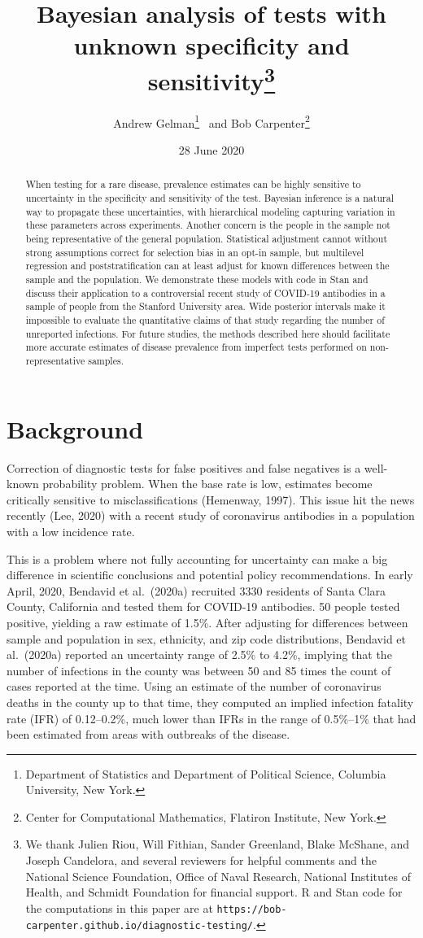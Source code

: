 \documentclass[11pt]{article}
\title{\bf Bayesian analysis of tests with unknown specificity and sensitivity\footnote{We thank Julien Riou, Will Fithian, Sander Greenland, Blake McShane, and Joseph Candelora, and several reviewers for helpful comments and the National Science Foundation, Office of Naval Research, National Institutes of Health, and Schmidt Foundation for financial support.  R and Stan code for the computations in this paper are at {\tt https://bob-carpenter.github.io/diagnostic-testing/}.}\vspace{.1in}}
\author{Andrew Gelman\footnote{Department of Statistics and Department of
Political Science, Columbia University, New York.}  \ and Bob Carpenter\footnote{Center for Computational Mathematics, Flatiron Institute, New York.}
\vspace{.1in}}
\date{28 June 2020}
\begin{document}
\sloppy
\maketitle

\begin{abstract}
\noindent
When testing for a rare disease, prevalence estimates can be highly sensitive to uncertainty in the specificity and sensitivity of the test.  Bayesian inference is a natural way to propagate these uncertainties, with hierarchical modeling capturing variation in these parameters across experiments.  Another concern is the people in the sample not being representative of the general population.  Statistical adjustment cannot without strong assumptions correct for selection bias in an opt-in sample, but multilevel regression and poststratification can at least adjust for known differences between the sample and the population.  We demonstrate these models with code in Stan and discuss their application to a controversial recent study of COVID-19 antibodies in a sample of people from the Stanford University area.  Wide posterior intervals make it impossible to evaluate the quantitative claims of that study regarding the number of unreported infections.  For future studies, the methods described here should facilitate more accurate estimates of disease prevalence from imperfect tests performed on non-representative samples.
\end{abstract}

\section{Background}

Correction of diagnostic tests for false positives and false negatives is a well-known probability problem.  When the base rate is low, estimates become critically sensitive to misclassifications (Hemenway, 1997).  This issue hit the news recently (Lee, 2020) with a recent study of coronavirus antibodies in a population with a low incidence rate.

This is a problem where not fully accounting for uncertainty can make a big difference in scientific conclusions and potential policy recommendations.  In early April, 2020, Bendavid et al.\ (2020a) recruited 3330 residents of Santa Clara County, California and tested them for COVID-19 antibodies.  50 people tested positive, yielding a raw estimate of 1.5\%.  After adjusting for differences between sample and population in sex, ethnicity, and zip code distributions, Bendavid et al.\ (2020a) reported an uncertainty range of 2.5\% to 4.2\%, implying that the number of infections in the county was between 50 and 85 times the count of cases reported at the time.  Using an estimate of the number of coronavirus deaths in the county up to that time, they computed an implied infection fatality rate (IFR) of 0.12--0.2\%, much lower than IFRs in the range of 0.5\%--1\% that had been estimated from areas with outbreaks of the disease.
\end{document}
